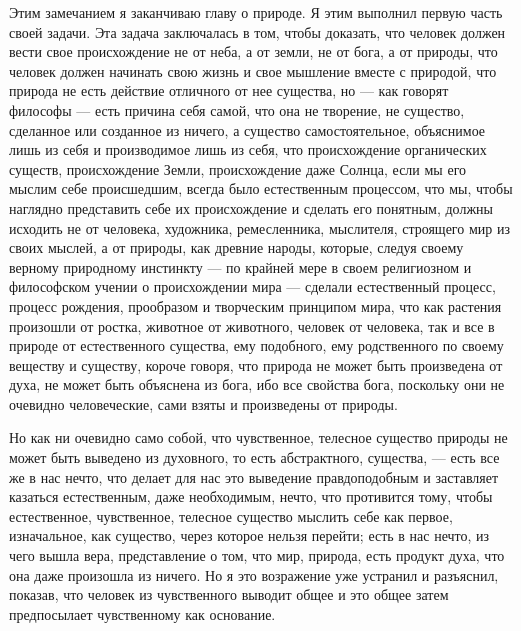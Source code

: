\documentclass[12pt]{article}
\begin{document}
Этим замечанием я заканчиваю главу о природе. Я этим выполнил первую часть своей задачи. Эта задача заключалась в том, чтобы доказать, что человек должен вести свое происхождение не от неба, а от земли, не от бога, а от природы, что человек должен начинать свою жизнь и свое мышление вместе с природой, что природа не есть действие отличного от нее существа, но --- как говорят философы --- есть причина себя самой, что она не творение, не существо, сделанное или созданное из ничего, а существо самостоятельное, объяснимое лишь из себя и производимое лишь из себя, что происхождение органических существ, происхождение Земли, происхождение даже Солнца, если мы его мыслим себе происшедшим, всегда было естественным процессом, что мы, чтобы наглядно представить себе их происхождение и сделать его понятным, должны исходить не от человека, художника, ремесленника, мыслителя, строящего мир из своих мыслей, а от природы, как древние народы, которые, следуя своему верному природному инстинкту --- по крайней мере в своем религиозном и философском учении о происхождении мира --- сделали естественный процесс, процесс рождения, прообразом и творческим принципом мира, что как растения произошли от ростка, животное от животного, человек от человека, так и все в природе от естественного существа, ему подобного, ему родственного по своему веществу и существу, короче говоря, что природа не может быть произведена от духа, не может быть объяснена из бога, ибо все свойства бога, поскольку они не очевидно человеческие, сами взяты и произведены от природы. 

Но как ни очевидно само собой, что чувственное, телесное существо природы не может быть выведено из духовного, то есть абстрактного, существа, --- есть все же в нас нечто, что делает для нас это выведение правдоподобным и заставляет казаться естественным, даже необходимым, нечто, что противится тому, чтобы естественное, чувственное, телесное существо мыслить себе как первое, изначальное, как существо, через которое нельзя перейти; есть в нас нечто, из чего вышла вера, представление о том, что мир, природа, есть продукт духа, что она даже произошла из ничего. Но я это возражение уже устранил и разъяснил, показав, что человек из чувственного выводит общее и это общее затем предпосылает чувственному как основание. 
\end{document}
